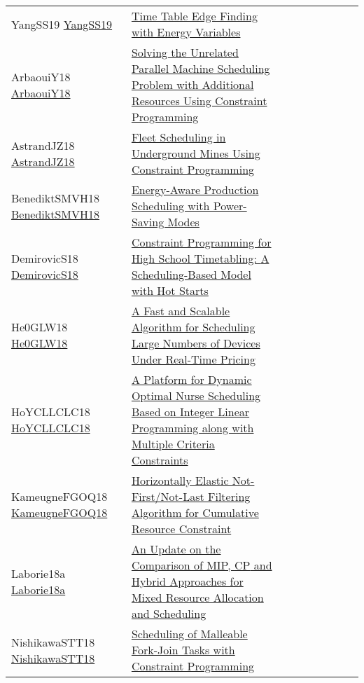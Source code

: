 {\begin{longtable}{p{3cm}p{7cm}lllllll}
YangSS19 \href{https://doi.org/10.1007/978-3-030-19212-9\_42}{YangSS19} &  \href{papers/YangSS19.pdf}{Time Table Edge Finding with Energy Variables} &  &  &  &  &  &  & \\
ArbaouiY18 \href{https://doi.org/10.1007/978-3-319-75420-8\_67}{ArbaouiY18} &  \href{papers/ArbaouiY18.pdf}{Solving the Unrelated Parallel Machine Scheduling Problem with Additional Resources Using Constraint Programming} &  &  &  &  &  &  & \\
AstrandJZ18 \href{https://doi.org/10.1007/978-3-319-93031-2\_44}{AstrandJZ18} &  \href{papers/AstrandJZ18.pdf}{Fleet Scheduling in Underground Mines Using Constraint Programming} &  &  &  &  &  &  & \\
BenediktSMVH18 \href{https://doi.org/10.1007/978-3-319-93031-2\_6}{BenediktSMVH18} &  \href{papers/BenediktSMVH18.pdf}{Energy-Aware Production Scheduling with Power-Saving Modes} &  &  &  &  &  &  & \\
DemirovicS18 \href{https://doi.org/10.1007/978-3-319-93031-2\_10}{DemirovicS18} &  \href{papers/DemirovicS18.pdf}{Constraint Programming for High School Timetabling: {A} Scheduling-Based Model with Hot Starts} &  &  &  &  &  &  & \\
He0GLW18 \href{https://doi.org/10.1007/978-3-319-98334-9\_42}{He0GLW18} &  \href{papers/He0GLW18.pdf}{A Fast and Scalable Algorithm for Scheduling Large Numbers of Devices Under Real-Time Pricing} &  &  &  &  &  &  & \\
HoYCLLCLC18 \href{https://doi.org/10.1145/3299819.3299825}{HoYCLLCLC18} &  \href{papers/HoYCLLCLC18.pdf}{A Platform for Dynamic Optimal Nurse Scheduling Based on Integer Linear Programming along with Multiple Criteria Constraints} &  &  &  &  &  &  & \\
KameugneFGOQ18 \href{https://doi.org/10.1007/978-3-319-93031-2\_23}{KameugneFGOQ18} &  \href{papers/KameugneFGOQ18.pdf}{Horizontally Elastic Not-First/Not-Last Filtering Algorithm for Cumulative Resource Constraint} &  &  &  &  &  &  & \\
Laborie18a \href{https://doi.org/10.1007/978-3-319-93031-2\_29}{Laborie18a} &  \href{papers/Laborie18a.pdf}{An Update on the Comparison of MIP, {CP} and Hybrid Approaches for Mixed Resource Allocation and Scheduling} &  &  &  &  &  &  & \\
NishikawaSTT18 \href{https://doi.org/10.1109/CANDAR.2018.00025}{NishikawaSTT18} &  \href{papers/NishikawaSTT18.pdf}{Scheduling of Malleable Fork-Join Tasks with Constraint Programming} &  &  &  &  &  &  & \\

\end{longtable}}
